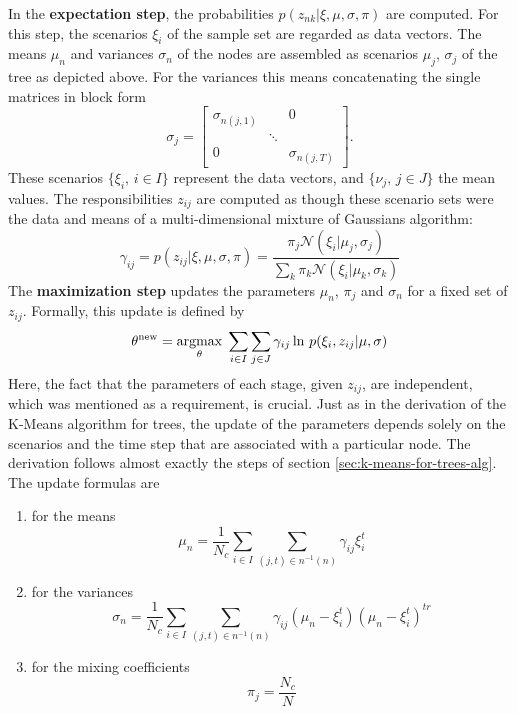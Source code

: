 In the \textbf{expectation step}, the probabilities $p(z_{nk}|\xi, \mu,\sigma,\pi)$ are computed.
For this step, the scenarios $\xi_i$ of the sample set are regarded as data vectors.
The means $\mu_n$ and variances $\sigma_n$ of the nodes are assembled as scenarios $\mu_j$, $\sigma_j$ of the tree as depicted above.
For the variances this means concatenating the single matrices in block form
\begin{equation}
  \label{eq:58}
  \sigma_j = \left[\begin{array}{ccc}\sigma_{n(j,1)}&&0\\ &\ddots\\ 0&&\sigma_{n(j,T)}\end{array} \right].
\end{equation}
These scenarios $\{\xi_i,\, i\in I\}$ represent the data vectors, and $\{\nu_j,\, j\in J\}$ the mean values.
The responsibilities $z_{ij}$ are computed as though these scenario sets were the data and means of a multi-dimensional mixture of Gaussians algorithm:
\begin{equation}
  \label{eq:57}
  \gamma_{ij} = p(z_{ij}|\xi, \mu,\sigma,\pi) = \frac{\pi_j\mathcal{N}(\xi_i|\mu_j, \sigma_j)}{\sum_k\pi_k\mathcal{N}(\xi_i|\mu_k,\sigma_k)}
\end{equation}
The \textbf{maximization step} updates the parameters $\mu_n$, $\pi_j$ and $\sigma_n$ for a fixed set of $z_{ij}$.
Formally, this update is defined by
\begin{equation}
  \label{eq:59}
  \theta^{\mathrm{new}} = \underset{\theta}{\operatorname{argmax}}\; \sum_{i\in I}\sum_{j\in J}\gamma_{ij}\ln\,p(\xi_i,z_{ij}|\mu, \sigma)
\end{equation}
Here, the fact that the parameters of each stage, given $z_{ij}$, are independent, which was mentioned as a requirement, is crucial.
Just as in the derivation of the K-Means algorithm for trees, the update of the parameters depends solely on the scenarios and the time step that are associated with a particular node.
The derivation follows almost exactly the steps of section \ref{sec:k-means-for-trees-alg}.
The update formulas are
\begin{enumerate}
\item for the means
  \begin{equation}
    \label{eq:61}
    \mu_n = \frac{1}{N_c}\sum_{i\in I}\sum_{(j,t)\in n^{-1}(n)} \gamma_{ij}\xi_i^t
  \end{equation}
\item for the variances
  \begin{equation}
    \label{eq:62}
    \sigma_n = \frac{1}{N_c}\sum_{i\in I}\sum_{(j,t)\in n^{-1}(n)} \gamma_{ij}(\mu_n-\xi_i^t)(\mu_n-\xi_i^t)^{tr}
  \end{equation}
  \item for the mixing coefficients
    \begin{equation}
      \label{eq:63}
      \pi_j = \frac{N_c}{N}
    \end{equation}
\end{enumerate}
